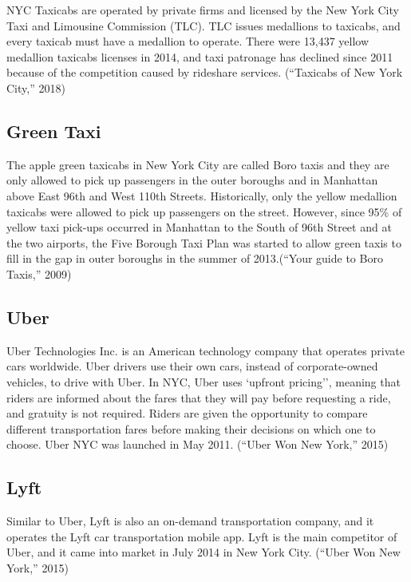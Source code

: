 \documentclass[12pt,twoside]{reedthesis}
\theoremstyle{definition}
\theoremstyle{definition}
\theoremstyle{definition}
\theoremstyle{remark}
\begin{document}
NYC Taxicabs are operated by private firms and licensed by the New York
City Taxi and Limousine Commission (TLC). TLC issues medallions to
taxicabs, and every taxicab must have a medallion to operate. There were
13,437 yellow medallion taxicabs licenses in 2014, and taxi patronage
has declined since 2011 because of the competition caused by rideshare
services. (``Taxicabs of New York City,'' 2018)

\subsection{Green Taxi}\label{green-taxi}

The apple green taxicabs in New York City are called Boro taxis and they
are only allowed to pick up passengers in the outer boroughs and in
Manhattan above East 96th and West 110th Streets. Historically, only the
yellow medallion taxicabs were allowed to pick up passengers on the
street. However, since 95\% of yellow taxi pick-ups occurred in
Manhattan to the South of 96th Street and at the two airports, the Five
Borough Taxi Plan was started to allow green taxis to fill in the gap in
outer boroughs in the summer of 2013.(``Your guide to Boro Taxis,''
2009)

\subsection{Uber}\label{uber}

Uber Technologies Inc. is an American technology company that operates
private cars worldwide. Uber drivers use their own cars, instead of
corporate-owned vehicles, to drive with Uber. In NYC, Uber uses `upfront
pricing'', meaning that riders are informed about the fares that they
will pay before requesting a ride, and gratuity is not required. Riders
are given the opportunity to compare different transportation fares
before making their decisions on which one to choose. Uber NYC was
launched in May 2011. (``Uber Won New York,'' 2015)

\subsection{Lyft}\label{lyft}

Similar to Uber, Lyft is also an on-demand transportation company, and
it operates the Lyft car transportation mobile app. Lyft is the main
competitor of Uber, and it came into market in July 2014 in New York
City. (``Uber Won New York,'' 2015)
\end{document}
